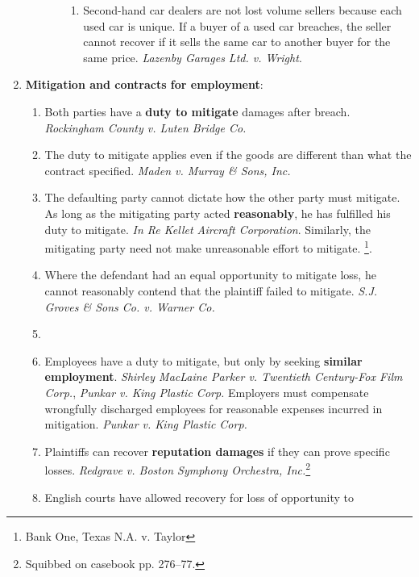 \begin{enumerate}
\begin{enumerate}
\begin{enumerate}
\begin{enumerate}
                \item Second-hand car dealers are not lost volume sellers 
                because each used car is unique. If a buyer of a used car 
                breaches, the seller cannot recover if it sells the same car 
                to another buyer for the same price. \emph{Lazenby Garages 
                Ltd. v. Wright}.
            \end{enumerate}
        \end{enumerate}
    \end{enumerate}
    \item \textbf{Mitigation and contracts for employment}:
    \begin{enumerate}
        \item Both parties have a \textbf{duty to mitigate} damages after 
        breach. \emph{Rockingham County v. Luten Bridge Co.}
        \item The duty to mitigate applies even if the goods are different 
        than what the contract specified. \emph{Maden v. Murray \& Sons, Inc.}
        \item The defaulting party cannot dictate how the other party must 
        mitigate. As long as the mitigating party acted \textbf{reasonably}, 
        he has fulfilled his duty to mitigate. \emph{In Re Kellet Aircraft 
        Corporation}. Similarly, the mitigating party need not make 
        unreasonable effort to mitigate. \footnote{Bank One, Texas N.A. v. 
        Taylor}.
        \item Where the defendant had an equal opportunity to mitigate loss, 
        he cannot reasonably contend that the plaintiff failed to mitigate. 
        \emph{S.J. Groves \& Sons Co. v. Warner Co.}
        \item %
        \item Employees have a duty to mitigate, but only by seeking 
        \textbf{similar employment}. \emph{Shirley MacLaine Parker v.  
        Twentieth Century-Fox Film Corp.}, \emph{Punkar v. King Plastic 
        Corp.} Employers must compensate wrongfully discharged employees for 
        reasonable expenses incurred in mitigation. \emph{Punkar v. King 
        Plastic Corp.}
        \item Plaintiffs can recover \textbf{reputation damages} if they can 
        prove specific losses. \emph{Redgrave v. Boston Symphony Orchestra, 
        Inc.}\footnote{Squibbed on casebook pp. 276--77.}
        \item English courts have allowed recovery for loss of opportunity to 

\end{enumerate}
\end{enumerate}
